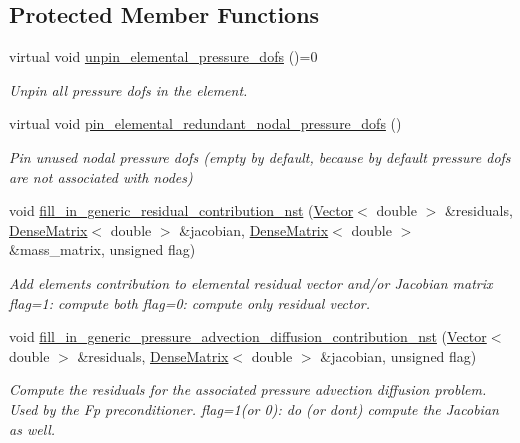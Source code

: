 \subsection*{Protected Member Functions}
\begin{DoxyCompactItemize}
\item 
virtual void \hyperlink{classoomph_1_1RefineableNavierStokesEquations_acd0b56b66d250625401a9f6578f8bebc}{unpin\+\_\+elemental\+\_\+pressure\+\_\+dofs} ()=0
\begin{DoxyCompactList}\small\item\em Unpin all pressure dofs in the element. \end{DoxyCompactList}\item 
virtual void \hyperlink{classoomph_1_1RefineableNavierStokesEquations_a5dbf8764b44554159043a45df312a7e3}{pin\+\_\+elemental\+\_\+redundant\+\_\+nodal\+\_\+pressure\+\_\+dofs} ()
\begin{DoxyCompactList}\small\item\em Pin unused nodal pressure dofs (empty by default, because by default pressure dofs are not associated with nodes) \end{DoxyCompactList}\item 
void \hyperlink{classoomph_1_1RefineableNavierStokesEquations_a63a9aff288190f8d2abb0e985c08c1f0}{fill\+\_\+in\+\_\+generic\+\_\+residual\+\_\+contribution\+\_\+nst} (\hyperlink{classoomph_1_1Vector}{Vector}$<$ double $>$ \&residuals, \hyperlink{classoomph_1_1DenseMatrix}{Dense\+Matrix}$<$ double $>$ \&jacobian, \hyperlink{classoomph_1_1DenseMatrix}{Dense\+Matrix}$<$ double $>$ \&mass\+\_\+matrix, unsigned flag)
\begin{DoxyCompactList}\small\item\em Add element\textquotesingle{}s contribution to elemental residual vector and/or Jacobian matrix flag=1\+: compute both flag=0\+: compute only residual vector. \end{DoxyCompactList}\item 
void \hyperlink{classoomph_1_1RefineableNavierStokesEquations_aa5fb8ebc1a96ed6fc7733c5aaa238582}{fill\+\_\+in\+\_\+generic\+\_\+pressure\+\_\+advection\+\_\+diffusion\+\_\+contribution\+\_\+nst} (\hyperlink{classoomph_1_1Vector}{Vector}$<$ double $>$ \&residuals, \hyperlink{classoomph_1_1DenseMatrix}{Dense\+Matrix}$<$ double $>$ \&jacobian, unsigned flag)
\begin{DoxyCompactList}\small\item\em Compute the residuals for the associated pressure advection diffusion problem. Used by the Fp preconditioner. flag=1(or 0)\+: do (or don\textquotesingle{}t) compute the Jacobian as well. \end{DoxyCompactList}\item 

\end{DoxyCompactItemize}
